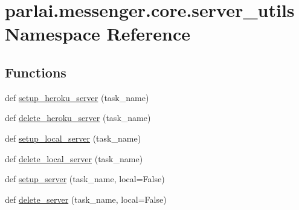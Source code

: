 \hypertarget{namespaceparlai_1_1messenger_1_1core_1_1server__utils}{}\section{parlai.\+messenger.\+core.\+server\+\_\+utils Namespace Reference}
\label{namespaceparlai_1_1messenger_1_1core_1_1server__utils}
\subsection*{Functions}
\begin{DoxyCompactItemize}
\item 
def \hyperlink{namespaceparlai_1_1messenger_1_1core_1_1server__utils_a3da4024deca88ca3c1ac20a2857b06db}{setup\+\_\+heroku\+\_\+server} (task\+\_\+name)
\item 
def \hyperlink{namespaceparlai_1_1messenger_1_1core_1_1server__utils_a94b0647ae0e38dcada7dd0c4501dd179}{delete\+\_\+heroku\+\_\+server} (task\+\_\+name)
\item 
def \hyperlink{namespaceparlai_1_1messenger_1_1core_1_1server__utils_a3b993fcdfa397479c469c7d20dcbfd9d}{setup\+\_\+local\+\_\+server} (task\+\_\+name)
\item 
def \hyperlink{namespaceparlai_1_1messenger_1_1core_1_1server__utils_a0c2ab25112f98f6d7f95174f8f55f4fa}{delete\+\_\+local\+\_\+server} (task\+\_\+name)
\item 
def \hyperlink{namespaceparlai_1_1messenger_1_1core_1_1server__utils_a006ba5635b31336c4dd80b795025b29b}{setup\+\_\+server} (task\+\_\+name, local=False)
\item 
def \hyperlink{namespaceparlai_1_1messenger_1_1core_1_1server__utils_a606f5ec3e035a05cae9d1b44ff88fdde}{delete\+\_\+server} (task\+\_\+name, local=False)
\end{DoxyCompactItemize}
